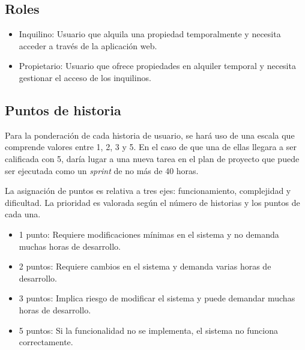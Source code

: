 \documentclass[
11pt, %
codirector, %
]{charter}
\begin{document}
\subsection{Roles}
\begin{itemize}
\item Inquilino: Usuario que alquila una propiedad temporalmente y necesita acceder a través de la aplicación web.
\item Propietario: Usuario que ofrece propiedades en alquiler temporal y necesita gestionar el acceso de los inquilinos.
\end{itemize}

\subsection{Puntos de historia}
Para la ponderación de cada historia de usuario, se hará uso de una escala que comprende valores entre 1, 2, 3 y 5. En el caso de que una de ellas llegara a ser calificada con 5, daría lugar a una nueva tarea en el plan de proyecto que puede ser ejecutada como un \textit{sprint} de no más de 40 horas.

La asignación de puntos es relativa a tres ejes: funcionamiento, complejidad y dificultad. La prioridad es valorada según el número de historias y los puntos de cada una.

\begin{itemize}
\item 1 punto: Requiere modificaciones mínimas en el sistema y no demanda muchas horas de desarrollo.
\item 2 puntos: Requiere cambios en el sistema y demanda varias horas de desarrollo.
\item 3 puntos: Implica riesgo de modificar el sistema y puede demandar muchas horas de desarrollo.
\item 5 puntos: Si la funcionalidad no se implementa, el sistema no funciona correctamente.
\end{itemize}
\end{document}
